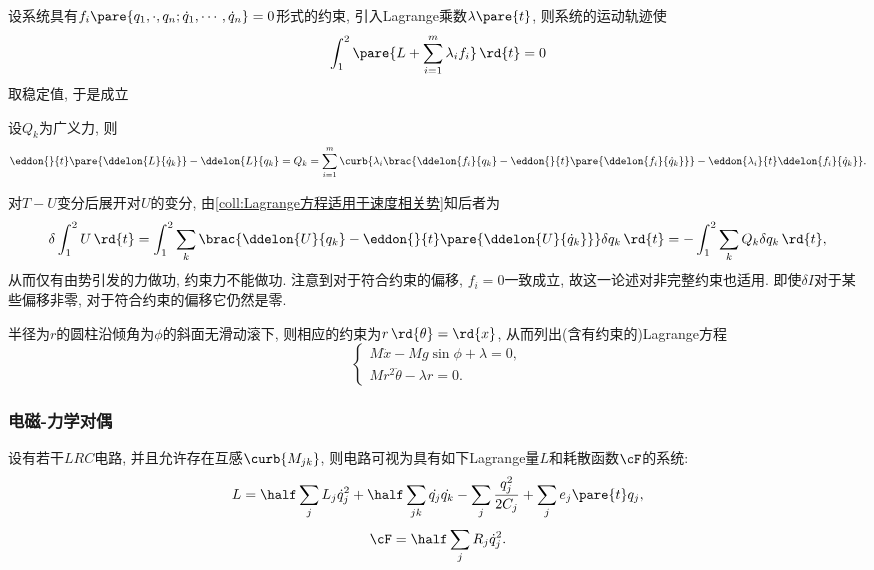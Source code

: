 \documentclass[../TheoreticalMechanics.tex]{subfiles}
\begin{document}
\begin{theorem}[非完整约束的变分]
	设系统具有$f_i\pare{q_1,\cdot,q_n;\dot{q}_1,\cdots,\dot{q}_n}=0$形式的约束, 引入Lagrange乘数$\lambda\pare{t}$, 则系统的运动轨迹使
	\[ \int_1^2 \pare{L+\sum_{i=1}^m\lambda_i f_i}\,\rd{t} = 0 \]
	取稳定值, 于是成立
	\begin{finale}
		设$Q_k$为广义力, 则
		\[ \eddon{}{t}\pare{\ddelon{L}{\dot{q}_k}} - \ddelon{L}{q_k} = Q_k = \sum_{i=1}^m\curb{\lambda_i\brac{\ddelon{f_i}{q_k} - \eddon{}{t}\pare{\ddelon{f_i}{\dot{q}_k}}} - \eddon{\lambda_i}{t}\ddelon{f_i}{\dot{q}_k}}. \]
	\end{finale}
\end{theorem}
\begin{remark}
	对$T-U$变分后展开对$U$的变分, 由\cref{coll:Lagrange方程适用于速度相关势}知后者为
	\[ \delta \int_1^2 U\,\rd{t} = \int_1^2 \sum_k\brac{\ddelon{U}{q_k} - \eddon{}{t}\pare{\ddelon{U}{\dot{q}_k}}}\delta q_k\,\rd{t} = -\int_1^2 \sum_k Q_k \delta q_k\,\rd{t}, \]
	从而仅有由势引发的力做功, 约束力不能做功. 注意到对于符合约束的偏移, $f_i=0$一致成立, 故这一论述对非完整约束也适用. 即使$\delta I$对于某些偏移非零, 对于符合约束的偏移它仍然是零.
\end{remark}
\begin{ex}
	半径为$r$的圆柱沿倾角为$\phi$的斜面无滑动滚下, 则相应的约束为$r\,\rd{\theta} = \rd{x}$, 从而列出(含有约束的)Lagrange方程
	\[ \begin{cases}
		M\ddot{x} - Mg\sin\phi + \lambda = 0,\\
		Mr^2\ddot{\theta} - \lambda r = 0.
	\end{cases} \]
\end{ex}


\subsubsection{电磁-力学对偶} %
\label{ssub:电磁-力学对偶}

\begin{theorem}[电路的Lagrange量]
	设有若干$LRC$电路, 并且允许存在互感$\curb{M_{jk}}$, 则电路可视为具有如下Lagrange量$L$和耗散函数$\cF$的系统:
	\[ L = \half \sum_j L_j \dot{q}_j^2 + \half \sum_{jk}\dot{q_j}\dot{q_k} - \sum_j \frac{q_j^2}{2C_j} + \sum_j e_j\pare{t} q_j, \]
	\[ \cF = \half \sum_j R_j \dot{q}_j^2. \]
\end{theorem}

\end{document}

